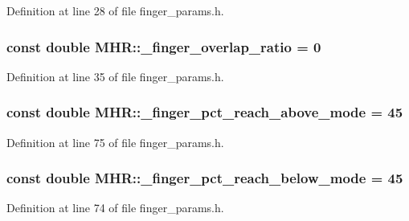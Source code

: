 Definition at line 28 of file finger\+\_\+params.\+h.

\hypertarget{namespace_m_h_r_a6ab2b5eaa5246621b9039b65e5501f1c}{
\subsubsection[{\+\_\+finger\+\_\+overlap\+\_\+ratio}]{\setlength{\rightskip}{0pt plus 5cm}const double M\+H\+R\+::\+\_\+finger\+\_\+overlap\+\_\+ratio = 0}}\label{namespace_m_h_r_a6ab2b5eaa5246621b9039b65e5501f1c}


Definition at line 35 of file finger\+\_\+params.\+h.

\hypertarget{namespace_m_h_r_a8c272379feda002b512fbc5e3e917000}{
\subsubsection[{\+\_\+finger\+\_\+pct\+\_\+reach\+\_\+above\+\_\+mode}]{\setlength{\rightskip}{0pt plus 5cm}const double M\+H\+R\+::\+\_\+finger\+\_\+pct\+\_\+reach\+\_\+above\+\_\+mode = 45}}\label{namespace_m_h_r_a8c272379feda002b512fbc5e3e917000}


Definition at line 75 of file finger\+\_\+params.\+h.

\hypertarget{namespace_m_h_r_a9714df3caf979755314e0a049dd96368}{
\subsubsection[{\+\_\+finger\+\_\+pct\+\_\+reach\+\_\+below\+\_\+mode}]{\setlength{\rightskip}{0pt plus 5cm}const double M\+H\+R\+::\+\_\+finger\+\_\+pct\+\_\+reach\+\_\+below\+\_\+mode = 45}}\label{namespace_m_h_r_a9714df3caf979755314e0a049dd96368}


Definition at line 74 of file finger\+\_\+params.\+h.

